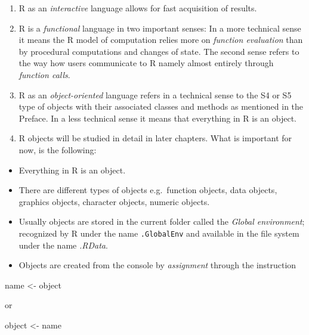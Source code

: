 \documentclass[
]{book}
\newenvironment{Shaded}{\begin{snugshade}}{\end{snugshade}}
\newcommand{\NormalTok}[1]{#1}
\newcommand{\OtherTok}[1]{\textcolor[rgb]{0.56,0.35,0.01}{#1}}
\providecommand{\tightlist}{%
  \setlength{\itemsep}{0pt}\setlength{\parskip}{0pt}}
\begin{document}
\begin{enumerate}
\def\labelenumi{(\alph{enumi})}
\item
  R as an \emph{{interactive}} language allows for fast acquisition of results.
\item
  R is a \emph{{functional}} language in two important senses: In a more technical sense it means the R model of computation relies more on \emph{{function evaluation}} than by procedural computations and changes of state. The second sense refers to the way how users communicate to R namely almost entirely through \emph{{function calls}}.
\item
  R as an \emph{{object-oriented}} language refers in a technical sense to the S4 or S5 type of objects with their associated classes and methods as mentioned in the Preface. In a less technical sense it means that everything in R is an object.
\item
  R objects will be studied in detail in later chapters. What is important for now, is the following:
\end{enumerate}

\begin{itemize}
\tightlist
\item
  Everything in R is an object.
\item
  There are different types of objects e.g.~function objects, data objects, graphics objects, character objects, numeric objects.
\item
  Usually objects are stored in the current folder called the \emph{{Global environment}}; recognized by R under the name \texttt{.GlobalEnv} and available in the file system under the name \emph{{.RData}}.
\item
  Objects are created from the console by \emph{{assignment}} through the instruction
\end{itemize}

\begin{Shaded}
\begin{Highlighting}[]
\NormalTok{name }\OtherTok{\textless{}{-}}\NormalTok{ object}
\end{Highlighting}
\end{Shaded}

or

\begin{Shaded}
\begin{Highlighting}[]
\NormalTok{object }\OtherTok{\textless{}{-}}\NormalTok{ name}
\end{Highlighting}
\end{Shaded}
\end{document}
